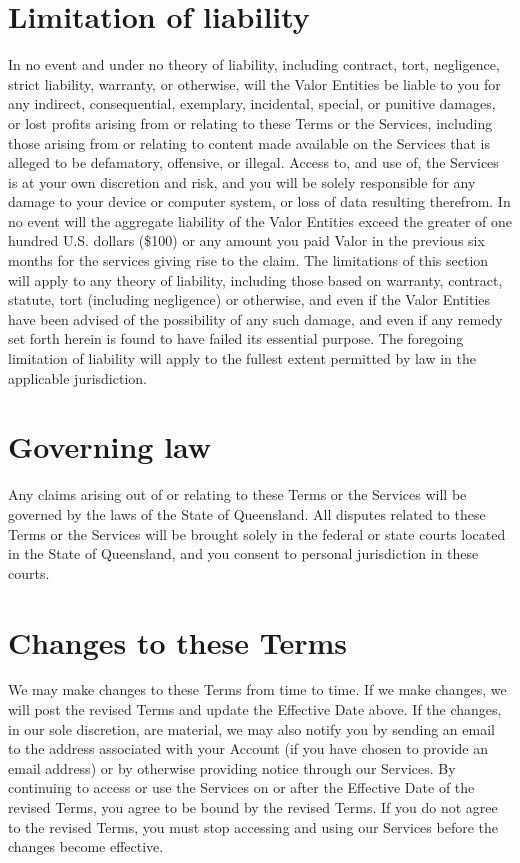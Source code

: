 \documentclass[10pt]{article}
\begin{document}
\section{Limitation of liability}
\label{sec:limitation-of-liability}
In no event and under no theory of liability, including contract, tort, negligence, strict liability, warranty, or otherwise, will the Valor Entities be liable to you for any indirect, consequential, exemplary, incidental, special, or punitive damages, or lost profits arising from or relating to these Terms or the Services, including those arising from or relating to content made available on the Services that is alleged to be defamatory, offensive, or illegal. Access to, and use of, the Services is at your own discretion and risk, and you will be solely responsible for any damage to your device or computer system, or loss of data resulting therefrom. In no event will the aggregate liability of the Valor Entities exceed the greater of one hundred U.S. dollars (\$100) or any amount you paid Valor in the previous six months for the services giving rise to the claim. The limitations of this section will apply to any theory of liability, including those based on warranty, contract, statute, tort (including negligence) or otherwise, and even if the Valor Entities have been advised of the possibility of any such damage, and even if any remedy set forth herein is found to have failed its essential purpose. The foregoing limitation of liability will apply to the fullest extent permitted by law in the applicable jurisdiction.


\section{Governing law}
\label{sec:governing-law}
Any claims arising out of or relating to these Terms or the Services will be governed by the laws of the State of Queensland. All disputes related to these Terms or the Services will be brought solely in the federal or state courts located in the State of Queensland, and you consent to personal jurisdiction in these courts.


\section{Changes to these Terms}
We may make changes to these Terms from time to time. If we make changes, we will post the revised Terms and update the Effective Date above. If the changes, in our sole discretion, are material, we may also notify you by sending an email to the address associated with your Account (if you have chosen to provide an email address) or by otherwise providing notice through our Services. By continuing to access or use the Services on or after the Effective Date of the revised Terms, you agree to be bound by the revised Terms. If you do not agree to the revised Terms, you must stop accessing and using our Services before the changes become effective.
\end{document}
